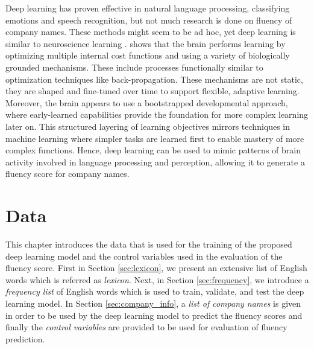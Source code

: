 \documentclass[a4paper,11pt]{report}
\begin{document}
Deep learning has proven effective in natural language processing, classifying emotions and speech recognition, but not much research is done on fluency of company names. These methods might seem to be ad hoc, yet deep learning is similar to neuroscience learning \cite{ML_neuro2}.  shows that the brain performs learning by optimizing multiple internal cost functions and using a variety of biologically grounded mechanisms. These include processes functionally similar to optimization techniques like back-propagation. These mechanisms are not static, they are shaped and fine-tuned over time to support flexible, adaptive learning. Moreover, the brain appears to use a bootstrapped developmental approach, where early-learned capabilities provide the foundation for more complex learning later on. This structured layering of learning objectives mirrors techniques in machine learning where simpler tasks are learned first to enable mastery of more complex functions. Hence, deep learning can be used to mimic patterns of brain activity involved in language processing and perception, allowing it to generate a fluency score for company names.

\chapter{Data} \label{sec:data}
This chapter introduces the data that is used for the training of the proposed deep learning model and the control variables used in the evaluation of the fluency score. First in Section \ref{sec:lexicon}, we present an extensive list of English words which is referred as \textit{lexicon}. Next, in Section \ref{sec:frequency}, we introduce a \textit{frequency list} of English words which is used to train, validate, and test the deep learning model. In Section \ref{sec:company_info}, a \textit{list of company names} is given in order to be used by the deep learning model to predict the fluency scores and finally the \textit{control variables} are provided to be used for evaluation of fluency prediction.
\end{document}
